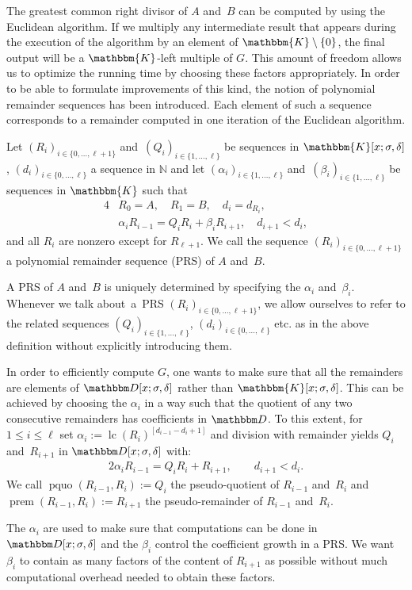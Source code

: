 \documentclass[3p,11pt,preprint]{elsarticle}
\let\set\mathbbm
\def\k{\set D}
\newcommand{\qk}{\set{K}}
\newcommand{\D}{x}
\newcommand{\alg}{\k[\D;\sigma,\delta]}
\newcommand{\qalg}{\qk[\D;\sigma,\delta]}
\newcommand{\lc}{\operatorname{lc}}
\newcommand{\pquo}{\operatorname{pquo}}
\newcommand{\prem}{\operatorname{prem}}
\newcommand{\prs}[3]{(#1_i)_{i\in \{#2,\dots,#3\}}}
\begin{document}
The greatest common right divisor of $A$ and~$B$ can be computed by using the Euclidean algorithm. If we multiply any intermediate result that appears during the execution of the  algorithm by an element of $\qk\setminus\{0\}$, the final output will be a $\qk$-left multiple of $G$. This amount of freedom allows us to optimize the running time by choosing these factors appropriately. In order to be able to formulate improvements of this kind, the notion of polynomial remainder sequences has been introduced. Each element of such a sequence corresponds to a remainder computed in one iteration of the Euclidean algorithm.
\begin{definition}
 Let $\prs{R}{0}{\ell+1}$ and~$\prs{Q}{1}{\ell}$ 
be sequences in $\qalg$, $\prs{d}{0}{\ell}$ a sequence in $\mathbb{N}$ and let $\prs{\alpha}{1}{\ell}$ and~$\prs{\beta}{1}{\ell}$ be sequences in $\qk$ such that
 \begin{alignat*}4
  & R_0    = A,\quad R_1 = B,\quad d_i    = d_{R_i},\\
  & \alpha_iR_{i-1}  = Q_iR_i + \beta_iR_{i+1},\quad d_{i+1} < d_i, 
\end{alignat*}
and all $R_i$ are nonzero except for $R_{\ell+1}$. We call the sequence $\prs{R}{0}{\ell+1}$ a polynomial remainder sequence (PRS) of $A$ and~$B$. 
\end{definition}

A PRS of $A$ and~$B$ is uniquely determined by specifying the $\alpha_i$ and~$\beta_i$. Whenever we talk about~a~PRS $\prs{R}{0}{\ell+1}$, we allow ourselves to refer to the related sequences $\prs{Q}{1}{\ell}$, $\prs{d}{0}{\ell}$ etc. as in the above definition without explicitly introducing them. 

In order to efficiently compute $G$, one wants to make sure that all the remainders are elements of $\alg$ rather than $\qalg$. This can be achieved by choosing the $\alpha_i$ in a way such that the quotient of any two consecutive remainders has coefficients in $\k$. To this extent, for $1\leq i\leq\ell$ set $\alpha_i:=\lc(R_i)^{[d_{i-1}-d_i+1]}$ and division with remainder yields $Q_i$ and~$R_{i+1}$ in $\alg$ with:
\begin{alignat}2
\label{premformula}
 \alpha_i R_{i-1} = Q_i{R_i} + R_{i+1},\qquad d_{i+1}<d_i.
\end{alignat}
We call $\pquo(R_{i-1},R_i):=Q_i$ the pseudo-quotient of $R_{i-1}$ and~$R_i$ and~$\prem(R_{i-1},R_i):=R_{i+1}$ the pseudo-remainder of $R_{i-1}$ and~$R_i$.

The $\alpha_i$ are used to make sure that computations can be done in $\alg$ and the $\beta_i$ control the coefficient growth in a PRS. We want $\beta_i$ to contain as many factors of the content of $R_{i+1}$ as possible without much computational overhead needed to obtain these factors.
\end{document}

